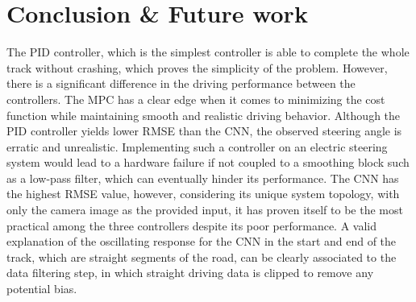 \chapter{Conclusion \& Future work}
The PID controller, which is the simplest controller is able to complete the whole track without crashing, which proves the simplicity of the problem. However, there is a significant difference in the driving performance between the controllers. The MPC has a clear edge when it comes to minimizing the cost function while maintaining smooth and realistic driving behavior. Although the PID controller yields lower RMSE than the CNN, the observed steering angle is erratic and unrealistic. Implementing such a controller on an electric steering system would lead to a hardware failure if not coupled to a smoothing block such as a low-pass filter, which can eventually hinder its performance. The CNN has the highest RMSE value, however, considering its unique system topology, with only the camera image as the provided input, it has proven itself to be the most practical among the three controllers despite its poor performance. A valid explanation of the oscillating response for the CNN in the start and end of the track, which are straight segments of the road, can be clearly associated to the data filtering step, in which straight driving data is clipped to remove any potential bias.